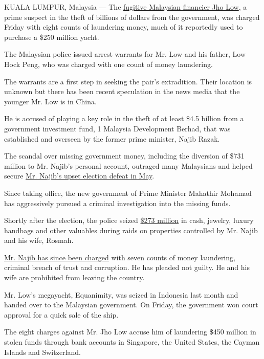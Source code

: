 KUALA LUMPUR, Malaysia --- The
\href{https://www.nytimes.com/2019/10/30/business/1mdb-jho-low-malaysia.html}{fugitive
Malaysian financier Jho Low}, a prime suspect in the theft of billions
of dollars from the government, was charged Friday with eight counts of
laundering money, much of it reportedly used to purchase a \$250 million
yacht.

The Malaysian police issued arrest warrants for Mr. Low and his father,
Low Hock Peng, who was charged with one count of money laundering.

The warrants are a first step in seeking the pair's extradition. Their
location is unknown but there has been recent speculation in the news
media that the younger Mr. Low is in China.

He is accused of playing a key role in the theft of at least \$4.5
billion from a government investment fund, 1 Malaysia Development
Berhad, that was established and overseen by the former prime minister,
Najib Razak.

The scandal over missing government money, including the diversion of
\$731 million to Mr. Najib's personal account, outraged many Malaysians
and helped secure
\href{https://www.nytimes.com/2018/05/15/world/asia/malaysia-najib-razak-fall.html}{Mr.
Najib's upset election defeat in May}.

Since taking office, the new government of Prime Minister Mahathir
Mohamad has aggressively pursued a criminal investigation into the
missing funds.

Shortly after the election, the police seized
\href{https://www.nytimes.com/2018/06/27/world/asia/malaysia-najib-razak-police-seizure.html}{\$273
million} in cash, jewelry, luxury handbags and other valuables during
raids on properties controlled by Mr. Najib and his wife, Rosmah.

\href{https://www.nytimes.com/2018/08/08/world/asia/malaysia-najib-razak-1mdb.html}{Mr.
Najib has since been charged} with seven counts of money laundering,
criminal breach of trust and corruption. He has pleaded not guilty. He
and his wife are prohibited from leaving the country.

Mr. Low's megayacht, Equanimity, was seized in Indonesia last month and
handed over to the Malaysian government. On Friday, the government won
court approval for a quick sale of the ship.

The eight charges against Mr. Jho Low accuse him of laundering \$450
million in stolen funds through bank accounts in Singapore, the United
States, the Cayman Islands and Switzerland.

